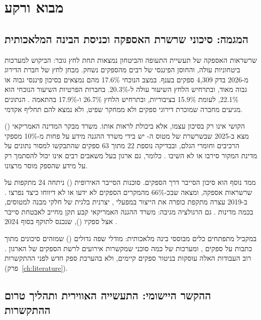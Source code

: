 \chapter{מבוא ורקע}

\section{המגמה: סיכוני שרשרת האספקה וכניסת הבינה המלאכותית}

שרשראות האספקה של תעשיית התעופה והביטחון נמצאות תחת לחץ גובר: הביקוש למערכות ביטחוניות עולה, והחוסן הפיננסי של רבים מהספקים נשחק. מבחן לחץ של חברת הדירוג  מ-2026 בדק 4,309 ספקים בענף. במצב הנוכחי 17.6\% מהם נמצאים בסיכון פיננסי גבוה או גבוה מאוד, ובתרחיש הלחץ השיעור עולה ל-20.3\%. בחברות הפרטיות השיעור הנוכחי הוא 22.1\%, לעומת 15.9\% בציבוריות, ובתרחיש הלחץ 26.7\% ו-17.9\% בהתאמה \cite{rapidratings2026}. הנתונים מגיעים מחברה שמוכרת דירוגי ספקים ולא ממחקר שפיט, ולא נמצא להם תחליף אקדמי.

הקושי אינו רק בסיכון עצמו, אלא ביכולת לראות אותו. משרד מבקר המדינה האמריקאי () מצא ב-2025 שבשרשרת של מטוס ה- יש בידי משרד ההגנה מידע על פחות מ-10\% מספקי הרכיבים וחומרי הגלם, ובבדיקה נוספת 22 מתוך 63 ספקים שהתבקשו למסור נתונים על מדינת המקור סירבו או לא השיבו \cite{gao2025}. כלומר, גם ארגון בעל משאבים רבים אינו יכול להסתמך רק על מידע שהספק מוסר מרצונו.

ממד נוסף הוא סיכון הסייבר דרך הספקים. סוכנות הסייבר האירופית () ניתחה 24 מתקפות על שרשראות אספקה, ומצאה שבכ-66\% מהמקרים הספקים לא ידעו או לא דיווחו כיצד נפרצו \cite{enisa2021}. ב-2019 עצרה מתקפת כופרה את הייצור במפעלי , יצרנית בלגית של חלקי מבנה למטוסים, בכמה מדינות \cite{certeu2019}. גם הרגולציה מגיבה: משרד ההגנה האמריקאי קבע תקן מחייב לאבטחת סייבר אצל ספקיו (), שנכנס לתוקף בסוף 2024 \cite{cmmc2024}.

במקביל מתפתחים כלים מבוססי בינה מלאכותית: מודלי שפה גדולים () שמזהים סיכונים מתוך כתבות על ספקים \cite{zhao2025}, ומערכות של כמה סוכני  שמקשרות אירועים לרשת הספקים של הארגון \cite{almahri2026}. רוב העבודות האלה עוסקות בניטור ספקים קיימים, ולא בהערכת ספק חדש לפני ההתקשרות (פרק~\ref{ch:literature}).

\section{ההקשר היישומי: התעשייה האווירית ותהליך טרום ההתקשרות}

